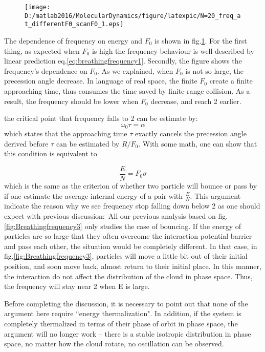 \documentclass[aps,pre,twocolumn
,groupedaddress]{revtex4-1}
\begin{document}
\begin{figure}
\centering
\texttt{[image: D:/matlab2016/MolecularDynamics/figure/latexpic/N=20\_freq\_at\_differentF0\_scanF0\_1.eps]}
\caption{{\color{red}{run with more initial state}}}
\label{fig:Breathingfrequency4}
\end{figure}

The dependence of frequency on energy and $F_0$ is shown in fig.\ref{fig:Breathingfrequency4}. For the first thing, as expected when $F_0$ is high the frequency behaviour is well-described by linear prediction eq.\ref{eq:breathingfrequency1}. Secondly, the figure shows the frequency's dependence on $F_0$. As we explained, when $F_0$ is not so large, the precession angle decrease. In language of real space, the finite $F_0$ create a finite approaching time, thus consumes the time saved by finite-range collision. As a result, the frequency should be lower when $F_0$ decrease, and reach 2 earlier.

the critical point that frequency falls to 2 can be estimate by:
\begin{equation}
\omega_0 \tau=\alpha
\end{equation}
which states that the approaching time $\tau$ exactly cancels the precession angle derived before
$\tau$ can be estimated by $R/F_0$. With some math, one can show that this condition is equivalent to 

\begin{equation}
\frac{E}{N}=F_0\sigma
\end{equation}
which is the same as the criterion of whether two particle will bounce or pass by if one estimate the average internal energy of a pair with $\frac{E}{N}$. This argument indicate the reason why we see frequency stop falling down below 2 as one should expect with previous discussion:\
All our previous analysis based on fig.\ref{fig:Breathingfrequency3} only studies the case of bouncing. If the energy of particles are so large that they often overcome the interaction potential barrier and pass each other, the situation would be completely different. In that case, in fig.\ref{fig:Breathingfrequency3}, particles will move a little bit out of their initial position, and soon move back, almost return to their initial place. In this manner, the interaction do not affect the distribution of the cloud in phase space. Thus, the frequency will stay near 2 when E is large.

Before completing the discussion, it is necessary to point out that none of the argument here require ``energy thermalization". In addition, if the system is completely thermalized in terms of their phase of orbit in phase space, the argument will no longer work -- there is a stable isotropic distribution in phase space, no matter how the cloud rotate, no oscillation can be observed.
\end{document}
